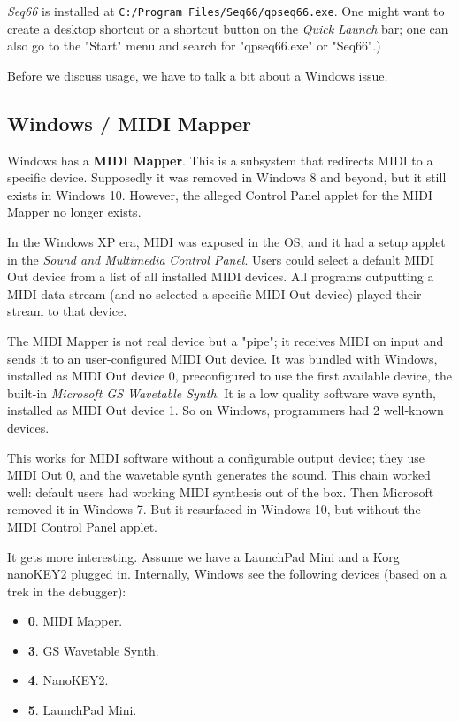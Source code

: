    \textsl{Seq66} is installed at
   \texttt{C:/Program Files/Seq66/qpseq66.exe}.
   One might want to create a desktop shortcut or a shortcut button on
   the \textsl{Quick Launch} bar; one can also go to the
   "Start" menu and search for "qpseq66.exe" or "Seq66".)

   Before we discuss usage, we have to talk a bit about a Windows issue.

\subsection{Windows / MIDI Mapper}
\label{subsec:windows_midi_mapper}

   Windows has a \textbf{MIDI Mapper}.
   This is a subsystem that redirects MIDI to a specific device.
   Supposedly it was removed in Windows 8 and beyond, but it still
   exists in Windows 10.
   However, the alleged Control Panel applet
   for the MIDI Mapper no longer exists.

   In the Windows XP era, MIDI was exposed in the OS, 
   and it had a setup applet in the
   \textsl{Sound and Multimedia}
   \textsl{Control Panel}.
   Users could select a default MIDI Out device from a list of all
   installed MIDI devices.
   All programs outputting a MIDI data stream
   (and no selected a specific MIDI Out device)
   played their stream to that device.

   The MIDI Mapper is not real device but a "pipe";
   it receives MIDI on input and sends it to an user-configured
   MIDI Out device.
   It was bundled with Windows, installed as MIDI Out device 0, preconfigured
   to use the first available device, the built-in
   \textsl{Microsoft GS Wavetable Synth}.
   It is a low quality software wave synth, installed as MIDI Out device 1.
   So on Windows, programmers had 2 well-known devices.

   This works for MIDI software without a configurable output device; they
   use MIDI Out 0, and the wavetable synth generates the sound.
   This chain worked well: default users had working MIDI synthesis
   out of the box.
   Then Microsoft removed it in Windows 7.
   But it resurfaced in Windows 10, but without the
   MIDI Control Panel applet.

   It gets more interesting.
   Assume we have a LaunchPad Mini and a Korg nanoKEY2 plugged in.
   Internally, Windows see the following devices (based on a trek
   in the debugger):

   \begin{itemize}
      \item \textbf{0}. MIDI Mapper.
      \item \textbf{3}. GS Wavetable Synth.
      \item \textbf{4}. NanoKEY2.
      \item \textbf{5}. LaunchPad Mini.
   \end{itemize}

